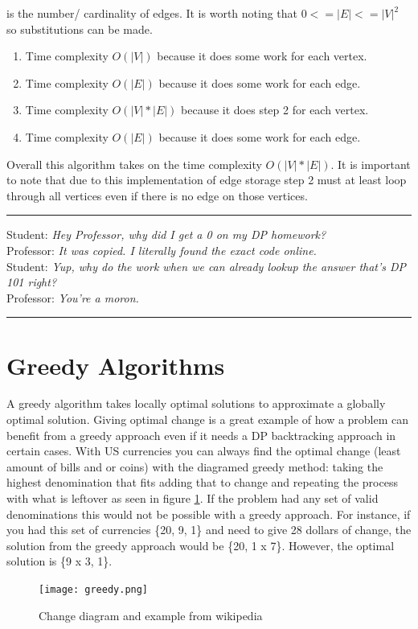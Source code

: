 \documentclass[letterpaper, 10pt]{article}
\begin{document}
is the number/ cardinality of edges. It is worth noting that \(0 <= |E| <= |V|^2\) so substitutions can be made.
\begin{enumerate}
    \item Time complexity \(O(|V|)\) because it does some work for each vertex.
    \item Time complexity \(O(|E|)\) because it does some work for each edge.
    \item Time complexity \(O(|V|*|E|)\) because it does step 2 for each vertex.
    \item Time complexity \(O(|E|)\) because it does some work for each edge.
\end{enumerate}
Overall this algorithm takes on the time complexity \(O(|V|*|E|)\). It is important to note that due to this implementation
of edge storage step 2 must at least loop through all vertices even if there is no edge on those vertices.
\vspace{.25cm}
\hrule
\vspace{.25cm}
\noindent
Student: \textit{Hey Professor, why did I get a 0 on my DP homework?}\\
Professor: \textit{It was copied. I literally found the exact code online.}\\
Student: \textit{Yup, why do the work when we can already lookup the answer that's DP 101 right?}\\
Professor: \textit{You're a moron.}\\
\hrule
\vspace{1cm}

\newpage
\section{Greedy Algorithms}
A greedy algorithm takes locally optimal solutions to approximate a globally optimal solution.
Giving optimal change is a great example of how a problem can benefit from a greedy approach even
if it needs a DP backtracking approach in certain cases. With US currencies you can always
find the optimal change (least amount of bills and or coins) with the diagramed greedy method: taking the highest denomination
that fits adding that to change and repeating the process with what is leftover as seen in figure \ref{fig:greedy}.
If the problem had any set of valid denominations this would not be possible with a greedy approach.
For instance, if you had this set of currencies \{20, 9, 1\} and need to give 28 dollars of change, the solution
from the greedy approach would be \{20, 1 x 7\}. However, the optimal solution is \{9 x 3, 1\}.
\begin{figure}[h]
    \centering
    \texttt{[image: greedy.png]}
    \caption{Change diagram and example from wikipedia}
    \label{fig:greedy}
\end{figure}
\end{document}
